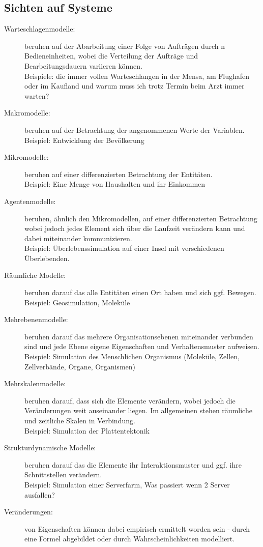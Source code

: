 \documentclass[11pt, fleqn, a4paper, leqno]{scrartcl} %
\begin{document}
	\subsection{Sichten auf Systeme}
	\begin{description}
		\item[Warteschlagenmodelle:]beruhen auf der Abarbeitung einer Folge von Aufträgen durch n Bedieneinheiten, wobei die Verteilung der Aufträge und Bearbeitungsdauern variieren können.\\
		Beispiele: die immer vollen Warteschlangen in der Mensa, am Flughafen oder im Kaufland und warum muss ich trotz Termin beim Arzt immer warten?
		\item[Makromodelle:]beruhen auf der Betrachtung der angenommenen Werte der Variablen.\\
		Beispiel: Entwicklung der Bevölkerung
		\item[Mikromodelle:] beruhen auf einer differenzierten Betrachtung der Entitäten.\\
		Beispiel: Eine Menge von Haushalten und ihr Einkommen
		\item[Agentenmodelle:] beruhen, ähnlich den Mikromodellen, auf einer differenzierten Betrachtung wobei jedoch jedes Element sich über die Laufzeit verändern kann und dabei miteinander kommunizieren.\\
		Beispiel: Überlebenssimulation auf einer Insel mit verschiedenen Überlebenden.
		\item[Räumliche Modelle:] beruhen darauf das alle Entitäten einen Ort haben und sich ggf. Bewegen.\\
		Beispiel: Geosimulation, Moleküle
		\item[Mehrebenenmodelle:] beruhen darauf das mehrere Organisationsebenen miteinander verbunden sind und jede Ebene eigene Eigenschaften und Verhaltensmuster aufweisen.\\
		Beispiel: Simulation des Menschlichen Organismus (Moleküle, Zellen, Zellverbände, Organe, Organismen)
		\item[Mehrskalenmodelle:]  beruhen darauf, dass sich die Elemente verändern, wobei jedoch die Veränderungen weit auseinander liegen. Im allgemeinen stehen räumliche und zeitliche Skalen in Verbindung.\\
		 Beispiel: Simulation der Plattentektonik
		\item[Strukturdynamische Modelle:] beruhen darauf das die Elemente ihr Interaktionsmuster und ggf. ihre Schnittstellen verändern.\\
		Beispiel: Simulation einer Serverfarm, Was passiert wenn 2 Server ausfallen?
		\item[Veränderungen:] von Eigenschaften können dabei empirisch ermittelt worden sein - durch eine Formel abgebildet oder durch Wahrscheinlichkeiten modelliert.
	\end{description}
\end{document}
